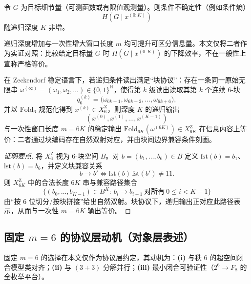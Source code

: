 \begin{proposition}[R2：条件不确定性的单调性]\label{prop:rec-R2}
令 $G$ 为目标细节量（可测函数或有限值观测量）。则条件不确定性（例如条件熵）
$$
H(G\mid x^{(0:K)})
$$
随递归深度 $K$ 非增。
\end{proposition}

\begin{proposition}\label{prop:rec-R3}
递归深度增加与一次性增大窗口长度 $m$ 均可提升可区分信息量。本文仅将二者作为实证对照：比较给定目标量 $G$ 时 $H(G\mid x^{(0:K)})$ 的下降效率，不在一般性上宣称严格等价。
\end{proposition}

\begin{proposition}\label{prop:rec-R4-block-equivalence}
在 Zeckendorf 稳定语言下，若递归条件读出满足“块协议”：存在一条同一原始无限串 $\omega^{(\infty)}=(\omega_1,\omega_2,\dots)\in\{0,1\}^{\mathbb{N}}$，使得第 $k$ 级读出读取其第 $k$ 个连续 6-块
\[
q_6^{(k)}=\bigl(\omega_{6k+1},\omega_{6k+2},\dots,\omega_{6k+6}\bigr),
\]
并以 $\mathrm{Fold}_6$ 规范化得到 $x^{(k)}\in X_6^{\mathrm Z}$，则深度 $K$ 的递归输出
\[
(x^{(0)},x^{(1)},\dots,x^{(K-1)})
\]
与一次性窗口长度 $m=6K$ 的稳定输出 $\mathrm{Fold}_{6K}(\omega^{(6K)})\in X_{6K}^{\mathrm Z}$ 在信息内容上等价：二者通过块编码存在自然双射对应，并由块间边界兼容条件刻画。
\end{proposition}

\begin{proof}[证明要点]
将 $X_6^{\mathrm Z}$ 视为 6-块空间 $B$。对 $b=(b_1,\dots,b_6)\in B$ 定义 $\mathrm{fst}(b)=b_1$、$\mathrm{lst}(b)=b_6$，并定义块兼容关系
\[
b\to b'\iff \mathrm{lst}(b)\,\mathrm{fst}(b')\neq 11.
\]
则 $X_{6K}^{\mathrm Z}$ 中的合法长度 $6K$ 串与兼容路径集合
\[
\{(b_0,\dots,b_{K-1})\in B^K:\ b_i\to b_{i+1}\ \text{对所有}\ 0\le i<K-1\}
\]
由“按 6 位切分/按块拼接”给出自然双射。块协议下，递归输出正对应此路径表示，从而与一次性 $m=6K$ 输出等价。
\end{proof}

\subsection{固定 \texorpdfstring{$m=6$}{m=6} 的协议层动机（对象层表述）}
固定 $m=6$ 的选择在本文仅作为协议层约定，其动机为：\textbf{(i)} 与秩 $6$ 的超空间闭合模型类对齐；\textbf{(ii)} 与 $(3+3)$ 分解并行；\textbf{(iii)} 最小闭合可验证性（$2^6\to F_8$ 的全枚举平台）。


